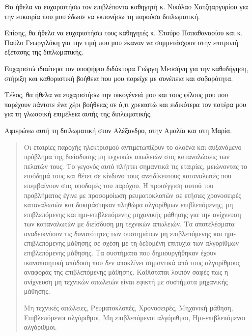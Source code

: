 \begin{acknowledgements}

Θα ήθελα να ευχαριστήσω τον επιβλέποντα καθηγητή κ. Νικόλαο Χατζηαργυρίου για την ευκαιρία που μου έδωσε να εκπονήσω τη παρούσα διπλωματική.

Επίσης, θα ήθελα να ευχαριστήσω  τους καθηγητές κ. Σταύρο Παπαθανασίου και κ. Παύλο Γεωργιλάκη για την τιμή που μου έκαναν να συμμετάσχουν στην επιτροπή εξέτασης της διπλωματικής.

Eυχαριστώ ιδιαίτερα τον υποψήφιο διδάκτορα Γιώργη Μεσσήνη για την καθοδήγηση, στήριξη και καθοριστική βοήθεια που μου παρείχε με συνέπεια και σοβαρότητα.

Τέλος, θα ήθελα να ευχαριστήσω την οικογένειά μου και τους φίλους μου που παρέχουν πάντοτε ένα χέρι βοήθειας σε ό,τι χρειαστώ και ειδικότερα τον πατέρα μου για τη γλωσσική επιμέλεια αυτής της διπλωματικής.

Αφιερώνω αυτή τη διπλωματική στον Αλέξανδρο, στην Αμαλία και στη Μαρία.
\end{acknowledgements}


\begin{abstract}
Οι εταιρίες παροχής ηλεκτρισμού αντιμετωπίζουν το ολοένα και αυξανόμενο πρόβλημα της διείσδυσης μη τεχνικών απωλειών στις καταναλώσεις των πελατών τους. Το γεγονός αυτό πλήττει σημαντικά τις εταιρίες, μειώνοντας το εισόδημά τους και θέτει σε κίνδυνο τους ανειδίκευτους καταναλωτές που επεμβαίνουν στις υποδομές του παρόχου. Η προσέγγιση αυτού του προβλήματος έγινε με προσομοίωση ρευματοκλοπών σε ετήσιες χρονοσειρές καταναλωτών και δοκιμάστηκαν πληθώρα αλγορίθμων επιβλεπόμενης, μη επιβλεπόμενης και ημι-επιβλεπόμενης μηχανικής μάθησης για την ανίχνευση των καταναλωτών με διείσδυση μη τεχνικών απωλειών. Τα αποτελέσματα αναδεικνύουν τις δυνατότητες των συστημάτων μη επιβλεπόμενης και ημι-επιβλεπόμενης μάθησης σε σχέση με τη δεδομένη επιτυχία των αλγορίθμων επιβλεπόμενης μάθησης. Τα συστήματα που δημιουργήθηκαν έχουν ικανοποιητική απόδοση που δεν αποκλίνει σημαντικά από τους αλγορίθμους αναφοράς της επιβλεπόμενης μάθησης. Καθίσταται λοιπόν σαφές πως η ανίχνευση μη τεχνικών απωλειών είναι εφικτή με συστήματα μηχανικής μάθησης.

\begin{keywords}
  Μη τεχνικές απώλειες, Ρευματοκλοπές, Χρονοσειρές, Μηχανική μάθηση, Επιβλεπόμενοι αλγόριθμοι, Μη επιβλεπόμενοι αλγόριθμοι, Ημι-επιβλεπόμενοι αλγόριθμοι.
 
\end{keywords}

\end{abstract}



